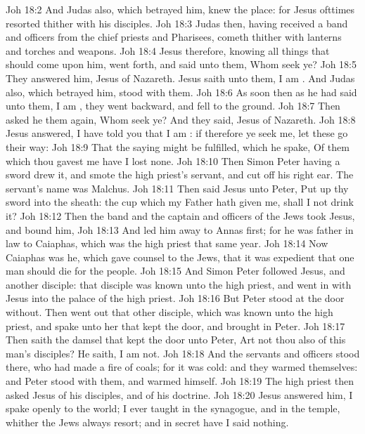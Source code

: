 \vs Joh 18:2 And Judas also, which betrayed him, knew the place: for Jesus ofttimes resorted thither with his disciples.
\vs Joh 18:3 Judas then, having received a band  and officers from the chief priests and Pharisees, cometh thither with lanterns and torches and weapons.
\vs Joh 18:4 Jesus therefore, knowing all things that should come upon him, went forth, and said unto them, Whom seek ye?
\vs Joh 18:5 They answered him, Jesus of Nazareth. Jesus saith unto them, I am . And Judas also, which betrayed him, stood with them.
\vs Joh 18:6 As soon then as he had said unto them, I am , they went backward, and fell to the ground.
\vs Joh 18:7 Then asked he them again, Whom seek ye? And they said, Jesus of Nazareth.
\vs Joh 18:8 Jesus answered, I have told you that I am : if therefore ye seek me, let these go their way:
\vs Joh 18:9 That the saying might be fulfilled, which he spake, Of them which thou gavest me have I lost none.
\vs Joh 18:10 Then Simon Peter having a sword drew it, and smote the high priest's servant, and cut off his right ear. The servant's name was Malchus.
\vs Joh 18:11 Then said Jesus unto Peter, Put up thy sword into the sheath: the cup which my Father hath given me, shall I not drink it?
\vs Joh 18:12 Then the band and the captain and officers of the Jews took Jesus, and bound him,
\vs Joh 18:13 And led him away to Annas first; for he was father in law to Caiaphas, which was the high priest that same year.
\vs Joh 18:14 Now Caiaphas was he, which gave counsel to the Jews, that it was expedient that one man should die for the people.
\vs Joh 18:15 And Simon Peter followed Jesus, and  another disciple: that disciple was known unto the high priest, and went in with Jesus into the palace of the high priest.
\vs Joh 18:16 But Peter stood at the door without. Then went out that other disciple, which was known unto the high priest, and spake unto her that kept the door, and brought in Peter.
\vs Joh 18:17 Then saith the damsel that kept the door unto Peter, Art not thou also  of this man's disciples? He saith, I am not.
\vs Joh 18:18 And the servants and officers stood there, who had made a fire of coals; for it was cold: and they warmed themselves: and Peter stood with them, and warmed himself.
\vs Joh 18:19 The high priest then asked Jesus of his disciples, and of his doctrine.
\vs Joh 18:20 Jesus answered him, I spake openly to the world; I ever taught in the synagogue, and in the temple, whither the Jews always resort; and in secret have I said nothing.
